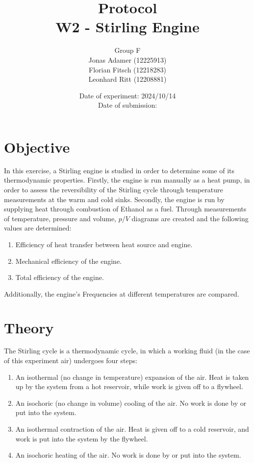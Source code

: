 \documentclass[titlepage]{article}
\title{Protocol \\ W2 - Stirling Engine}
\author{Group F\\Jonas Adamer (12225913)\\Florian Fitsch (12218283)\\Leonhard Ritt (12208881)}
\date{Date of experiment: 2024/10/14\\Date of submission:}
\begin{document}
\maketitle
\thispagestyle{empty}

\newpage
\tableofcontents
\thispagestyle{fancy}


\newpage
\section{Objective}
In this exercise, a Stirling engine is studied in order to determine some of its thermodynamic properties. Firstly, the engine is run manually as a heat pump, in order to assess the reversibility of the Stirling cycle through temperature measurements at the warm and cold sinks. Secondly, the engine is run by supplying heat through combustion of Ethanol as a fuel. Through measurements of temperature, pressure and volume, \(p/V\) diagrams are created and the following values are determined:
\begin{enumerate}
    \item Efficiency of heat transfer between heat source and engine.
    \item Mechanical efficiency of the engine.
    \item Total efficiency of the engine.
\end{enumerate}
Additionally, the engine's Frequencies at different temperatures are compared. 


\section{Theory}
The Stirling cycle is a thermodynamic cycle, in which a working fluid (in the case of this experiment air) undergoes four steps:
%
\begin{enumerate}
    \item An isothermal (no change in temperature) expansion of the air. Heat is taken up by the system from a hot reservoir, while work is given off to a flywheel.
    \item An isochoric (no change in volume) cooling of the air. No work is done by or put into the system.
    \item An isothermal contraction of the air. Heat is given off to a cold reservoir, and work is put into the system by the flywheel.
    \item An isochoric heating of the air. No work is done by or put into the system.
\end{enumerate}
\end{document}
